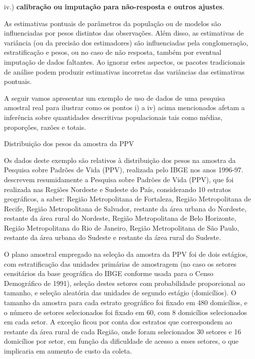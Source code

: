 \documentclass[]{book}
\theoremstyle{definition}
\theoremstyle{definition}
\theoremstyle{remark}
\let\BeginKnitrBlock\begin \let\EndKnitrBlock\end
\begin{document}
iv.) \textbf{calibração ou imputação para não-resposta e outros
ajustes}.

As estimativas pontuais de parâmetros da população ou de modelos são
influenciadas por pesos distintos das observações. Além disso, as
estimativas de variância (ou da precisão dos estimadores) são
influenciadas pela conglomeração, estratificação e pesos, ou no caso de
não resposta, também por eventual imputação de dados faltantes. Ao
ignorar estes aspectos, os pacotes tradicionais de análise podem
produzir estimativas incorretas das variâncias das estimativas pontuais.

A seguir vamos apresentar um exemplo de uso de dados de uma pesquisa
amostral real para ilustrar como os pontos i) a iv) acima mencionados
afetam a inferência sobre quantidades descritivas populacionais tais
como médias, proporções, razões e totais.

\BeginKnitrBlock{example}
\protect\hypertarget{ex:distppv}{}{\label{ex:distppv}}Distribuição dos pesos
da amostra da PPV
\EndKnitrBlock{example}

Os dados deste exemplo são relativos à distribuição dos pesos na amostra
da Pesquisa sobre Padrões de Vida (PPV), realizada pelo IBGE nos anos
1996-97. \citep{albieri} descrevem resumidamente a Pesquisa sobre
Padrões de Vida (PPV), que foi realizada nas Regiões Nordeste e Sudeste
do País, considerando 10 estratos geográficos, a saber: Região
Metropolitana de Fortaleza, Região Metropolitana de Recife, Região
Metropolitana de Salvador, restante da área urbana do Nordeste, restante
da área rural do Nordeste, Região Metropolitana de Belo Horizonte,
Região Metropolitana do Rio de Janeiro, Região Metropolitana de São
Paulo, restante da área urbana do Sudeste e restante da área rural do
Sudeste.

O plano amostral empregado na seleção da amostra da PPV foi de dois
estágios, com estratificação das unidades primárias de amostragem (no
caso os setores censitários da base geográfica do IBGE conforme usada
para o Censo Demográfico de 1991), seleção destes setores com
probabilidade proporcional ao tamanho, e seleção aleatória das unidades
de segundo estágio (domicílios). O tamanho da amostra para cada estrato
geográfico foi fixado em 480 domicílios, e o número de setores
selecionados foi fixado em 60, com 8 domicílios selecionados em cada
setor. A exceção ficou por conta dos estratos que correspondem ao
restante da área rural de cada Região, onde foram selecionados 30
setores e 16 domicílios por setor, em função da dificuldade de acesso a
esses setores, o que implicaria em aumento de custo da coleta.
\end{document}
